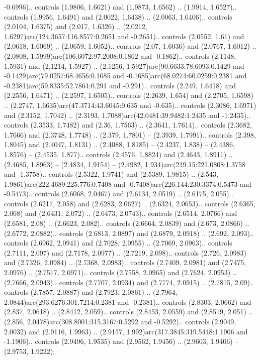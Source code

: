 -0.6996).. controls (1.9806, 1.6621) and (1.9873, 1.6562) .. (1.9914, 1.6527).. controls (1.9956, 1.6491) and (2.0022, 1.6438) .. (2.0063, 1.6406).. controls (2.0104, 1.6375) and (2.017, 1.6326) .. (2.0212, 1.6297)arc(124.3657:116.8577:0.2651 and -0.2651).. controls (2.0552, 1.61) and (2.0618, 1.6069) .. (2.0659, 1.6052).. controls (2.07, 1.6036) and (2.0767, 1.6012) .. (2.0808, 1.5999)arc(106.6072:97.2008:0.1862 and -0.1862).. controls (2.1148, 1.5931) and (2.1214, 1.5927) .. (2.1256, 1.5927)arc(90.6633:78.6093:0.1429 and -0.1429)arc(79.0257:68.4656:0.1685 and -0.1685)arc(68.0274:60.0259:0.2381 and -0.2381)arc(59.8335:52.7864:0.291 and -0.291).. controls (2.249, 1.6418) and (2.2556, 1.6471) .. (2.2597, 1.6505).. controls (2.2639, 1.654) and (2.2705, 1.6598) .. (2.2747, 1.6635)arc(47.3714:43.6045:0.635 and -0.635).. controls (2.3086, 1.6971) and (2.3152, 1.7042) .. (2.3193, 1.7088)arc(42.0481:39.9482:1.2435 and -1.2435).. controls (2.3533, 1.7482) and (2.36, 1.7563) .. (2.3641, 1.7614).. controls (2.3682, 1.7666) and (2.3748, 1.7748) .. (2.379, 1.7801) -- (2.3939, 1.7991).. controls (2.398, 1.8045) and (2.4047, 1.8131) .. (2.4088, 1.8185) -- (2.4237, 1.838) -- (2.4386, 1.8576) -- (2.4535, 1.877).. controls (2.4576, 1.8824) and (2.4643, 1.8911) .. (2.4685, 1.8963) -- (2.4834, 1.9154) -- (2.4982, 1.934)arc(219.15:221.0808:1.3758 and -1.3758).. controls (2.5322, 1.9741) and (2.5389, 1.9815) .. (2.543, 1.9861)arc(222.4689:225.776:0.7408 and -0.7408)arc(226.144:230.3374:0.5473 and -0.5473).. controls (2.6068, 2.0467) and (2.6134, 2.0519) .. (2.6175, 2.055).. controls (2.6217, 2.058) and (2.6283, 2.0627) .. (2.6324, 2.0653).. controls (2.6365, 2.068) and (2.6431, 2.072) .. (2.6473, 2.0743).. controls (2.6514, 2.0766) and (2.6581, 2.08) .. (2.6623, 2.082).. controls (2.6664, 2.0839) and (2.673, 2.0866) .. (2.6772, 2.0882).. controls (2.6813, 2.0897) and (2.6879, 2.0918) .. (2.692, 2.093).. controls (2.6962, 2.0941) and (2.7028, 2.0955) .. (2.7069, 2.0963).. controls (2.7111, 2.097) and (2.7178, 2.0977) .. (2.7219, 2.098).. controls (2.726, 2.0983) and (2.7326, 2.0984) .. (2.7368, 2.0983).. controls (2.7409, 2.0981) and (2.7475, 2.0976) .. (2.7517, 2.0971).. controls (2.7558, 2.0965) and (2.7624, 2.0953) .. (2.7666, 2.0943).. controls (2.7707, 2.0934) and (2.7774, 2.0915) .. (2.7815, 2.09).. controls (2.7857, 2.0887) and (2.7923, 2.0861) .. (2.7964, 2.0844)arc(293.6276:301.7214:0.2381 and -0.2381).. controls (2.8303, 2.0662) and (2.837, 2.0618) .. (2.8412, 2.059).. controls (2.8453, 2.0559) and (2.8519, 2.051) .. (2.856, 2.0478)arc(308.8001:315.3167:0.5292 and -0.5292).. controls (2.9049, 2.0032) and (2.9116, 1.9963) .. (2.9157, 1.992)arc(317.3845:319.5448:1.1906 and -1.1906).. controls (2.9496, 1.9535) and (2.9562, 1.9456) .. (2.9603, 1.9406) -- (2.9753, 1.9222);



